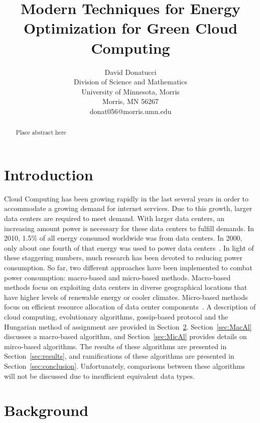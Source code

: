 \documentclass{sig-alternate}
\title{Modern Techniques for Energy Optimization for Green Cloud Computing}
\author{
\alignauthor
 		David Donatucci\\
        Division of Science and Mathematics\\
        University of Minnesota, Morris\\
        Morris, MN 56267\\
        donat056@morris.umn.edu\\
}
\date{}
\begin{document}
\pagestyle{plain}

\maketitle

\begin{abstract}

Place abstract here

\end{abstract}


\section{Introduction} \label{sec:intro}

Cloud Computing has been growing rapidly in the last several years in order to accommodate a growing demand for internet services. Due to this growth, larger data centers are required to meet demand. With larger data centers, an increasing amount power is necessary for these data centers to fulfill demands. In 2010, 1.5\% of all energy consumed worldwide was from data centers. In 2000, only about one fourth of that energy was used to power data centers~\cite{Yanggratoke}. In light of these staggering numbers, much research has been devoted to reducing power consumption. So far, two different approaches have been implemented to combat power consumption: macro-based and micro-based methods. Macro-based methods focus on exploiting data centers in diverse geographical locations that have higher levels of renewable energy or cooler climates. Micro-based methods focus on efficient resource allocation of data center components~\cite{Hassan}. A description of cloud computing, evolutionary algorithms, gossip-based protocol and the Hungarian method of assignment are provided in Section~\ref{Background}. Section~\ref{sec:MacAl} discusses a macro-based algorithm, and Section~\ref{sec:MicAl} provides details on mirco-based algorithms. The results of these algorithms are presented in Section~\ref{sec:results}, and ramifications of these algorithms are presented in Section~\ref{sec:conclusion}. Unfortunately, comparisons between these algorithms will not be discussed due to insufficient equivalent data types.

\section{Background} 
\label{Background}
\end{document}
